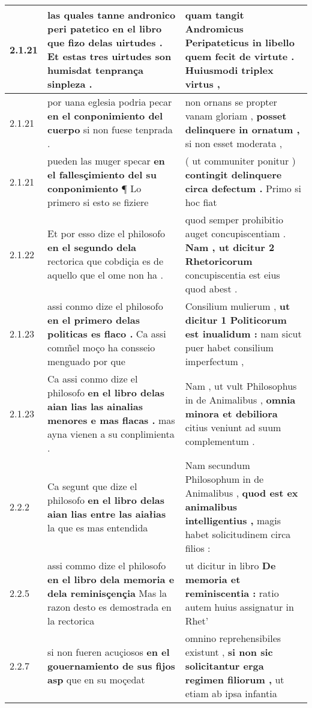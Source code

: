 \begin{tabular}{|p{1cm}|p{6.5cm}|p{6.5cm}|}
2.1.21 & las quales tanne andronico peri patetico \textbf{ en el libro que fizo delas uirtudes . } Et estas tres uirtudes son humisdat tenprança sinpleza . & quam tangit Andromicus Peripateticus in libello \textbf{ quem fecit de virtute . } Huiusmodi triplex virtus , \\\hline
2.1.21 & por uana eglesia podria pecar \textbf{ en el conponimiento del cuerpo } si non fuese tenprada . & non ornans se propter vanam gloriam , \textbf{ posset delinquere in ornatum , } si non esset moderata , \\\hline
2.1.21 & pueden las muger specar \textbf{ en el fallesçimiento del su conponimiento } ¶ Lo primero si esto se fiziere & ( ut communiter ponitur ) \textbf{ contingit delinquere circa defectum . } Primo si hoc fiat \\\hline
2.1.22 & Et por esso dize el philosofo \textbf{ en el segundo dela } rectorica que cobdiçia es de aquello que el ome non ha . & quod semper prohibitio auget concupiscentiam . \textbf{ Nam , ut dicitur 2 Rhetoricorum } concupiscentia est eius quod abest . \\\hline
2.1.23 & assi conmo dize el philosofo \textbf{ en el primero delas politicas es flaco . } Ca assi comm̃el moço ha consseio menguado por que & Consilium mulierum , \textbf{ ut dicitur 1 Politicorum est inualidum : } nam sicut puer habet consilium imperfectum , \\\hline
2.1.23 & Ca assi conmo dize el philosofo \textbf{ en el libro delas aian lias las ainalias menores e mas flacas . } mas ayna vienen a su conplimienta . & Nam , ut vult Philosophus in de Animalibus , \textbf{ omnia minora et debiliora } citius veniunt ad suum complementum . \\\hline
2.2.2 & Ca segunt que dize el philosofo \textbf{ en el libro delas aian lias entre las aiałias } la que es mas entendida & Nam secundum Philosophum in de Animalibus , \textbf{ quod est ex animalibus intelligentius , } magis habet solicitudinem circa filios : \\\hline
2.2.5 & assi commo dize el philosofo \textbf{ en el libro dela memoria e dela reminisçençia } Mas la razon desto es demostrada en la rectorica & ut dicitur in libro \textbf{ De memoria et reminiscentia : } ratio autem huius assignatur in Rhet’ \\\hline
2.2.7 & si non fueren acuçiosos \textbf{ en el gouernamiento de sus fijos asp } que en su moçedat & omnino reprehensibiles existunt , \textbf{ si non sic solicitantur erga regimen filiorum , } ut etiam ab ipsa infantia \\\hline

\end{tabular}
